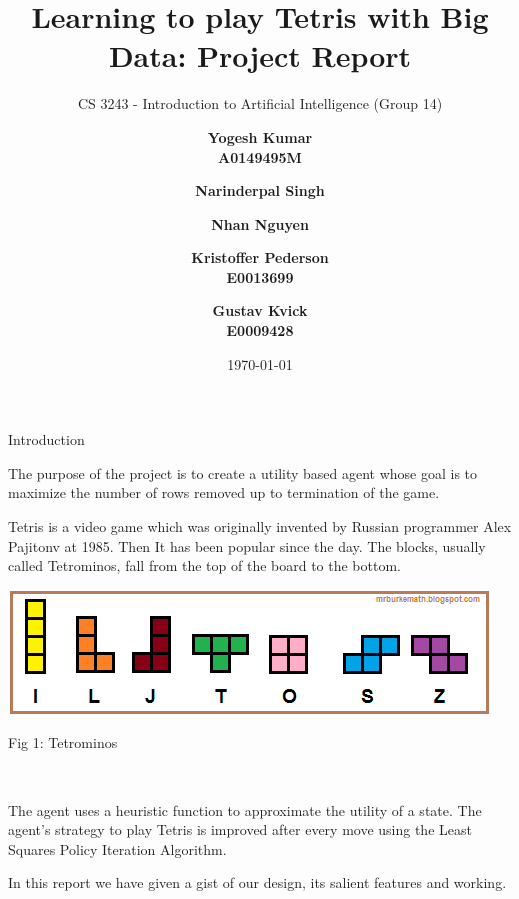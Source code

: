 \documentclass[a4paper,11pt]{resume}
\title{Learning to play Tetris with Big Data: Project Report}
\subtitle{CS 3243 - Introduction to Artificial Intelligence (Group 14)}
\author{\bf{Yogesh Kumar} \\ A0149495M  
\and \bf{Narinderpal Singh} \and \bf{Nhan Nguyen} \and \bf{Kristoffer Pederson} \\ E0013699 \and \bf{Gustav Kvick} \\ E0009428
    }
\date{\today}
\begin{document}
\vspace{-15pt}
\maketitle
\vspace{-5pt}
\begin{rSection}{{\heading Introduction}}
\begin{rSubsection}{}{}{}{}
\vspace{-5pt}
\item The purpose of the project is to create a utility based agent whose goal is to maximize the number of rows removed up to termination of the game. 


\begin{minipage}{0.65\textwidth}
\item Tetris is a video game which was originally invented by Russian programmer Alex Pajitonv at 1985. Then It has been popular since the day. The blocks, usually called Tetrominos, fall from the top of the board to the bottom.
\end{minipage}
\begin{minipage}{0.30\textwidth}
\centering
\includegraphics[width=\textwidth,scale=0.4]{tet.png}
\label{fig:find}
\caption{Fig 1: Tetrominos}
\end{minipage}
\\ 
\item The agent uses a heuristic function to approximate the utility of a state. The agent's strategy to play Tetris is improved after every move using the Least Squares Policy Iteration Algorithm.

\item In this report we have given a gist of our design, its salient features and working.
\end{rSubsection}
\end{rSection}
\end{document}
